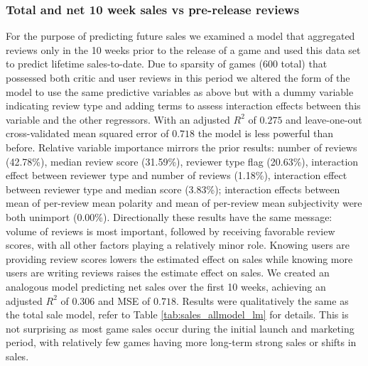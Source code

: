 \documentclass[letterpaper]{article}
\begin{document}
\subsubsection{Total and net 10 week sales vs pre-release reviews}
For the purpose of predicting future sales we examined a model that aggregated reviews only in the 10 weeks prior to the release of a game and used this data set to predict lifetime sales-to-date. Due to sparsity of games (600 total) that possessed both critic and user reviews in this period we altered the form of the model to use the same predictive variables as above but with a dummy variable indicating review type and adding terms to assess interaction effects between this variable and the other regressors. With an adjusted $R^2$ of $0.275$ and leave-one-out cross-validated mean squared error of $0.718$ the model is less powerful than before. Relative variable importance mirrors the prior results: number of reviews (42.78\%), median review score (31.59\%), reviewer type flag (20.63\%), interaction effect between reviewer type and number of reviews (1.18\%), interaction effect between reviewer type and median score (3.83\%); interaction effects between mean of per-review mean polarity and mean of per-review mean subjectivity were both unimport (0.00\%). Directionally these results have the same message: volume of reviews is most important, followed by receiving favorable review scores, with all other factors playing a relatively minor role. Knowing users are providing review scores lowers the estimated effect on sales while knowing more users are writing reviews raises the estimate effect on sales. We created an analogous model predicting net sales over the first 10 weeks, achieving an adjusted $R^2$ of $0.306$ and MSE of $0.718$. Results were qualitatively the same as the total sale model, refer to Table \ref{tab:sales_allmodel_lm} for details. This is not surprising as most game sales occur during the initial launch and marketing period, with relatively few games having more long-term strong sales or shifts in sales.
\end{document}
